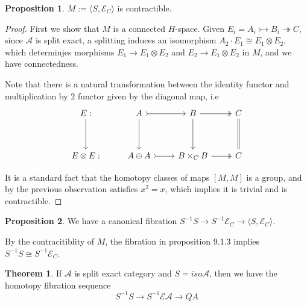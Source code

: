 \documentclass{article}
\theoremstyle{definition}
\newtheorem{theorem}{Theorem}[section]
\theoremstyle{definition}
\theoremstyle{definition}
\theoremstyle{definition}
\newtheorem{proposition}{Proposition}[theorem]
\theoremstyle{definition}
\theoremstyle{definition}
\theoremstyle{definition}
\begin{document}
\begin{tcolorbox}[colback=blue!5!white,colframe=blue!30!white]
\begin{proposition}
$M:=\langle S, \mathcal{E}_C \rangle$ is contractible.
\end{proposition}
\end{tcolorbox}
\begin{proof}
    First we show that $M$ is a connected $H$-space. Given $E_i=A_i\rightarrowtail B_i\twoheadrightarrow C$, since $\mathcal{A}$ is split exact, a splitting induces an isomorphism $A_2\cdot E_1\cong E_1\otimes E_2$, which determinjes morphisms $E_1\to E_1\otimes E_2$ and $E_2\to E_1\otimes E_2$ in $M$, and we have connectedness. 

    Note that there is a natural transformation between the identity functor and multiplication by $2$ functor given by the diagonal map, i.e 
    \[\begin{tikzcd}
        {E:} & A & B & C \\
        \\
        {E\otimes E:} & {A\oplus A} & {B\times_C B} & C
        \arrow[from=1-1, to=3-1]
        \arrow[tail, from=1-2, to=1-3]
        \arrow[from=1-2, to=3-2]
        \arrow[two heads, from=1-3, to=1-4]
        \arrow[from=1-3, to=3-3]
        \arrow[equal, from=1-4, to=3-4]
        \arrow[tail, from=3-2, to=3-3]
        \arrow[two heads, from=3-3, to=3-4]
    \end{tikzcd}\]

It is a standard fact that the homotopy classes of maps $[M,M]$ is a group, and by the previous observation satisfies $x^2=x$, which implies it is trivial and is contractible. 
\end{proof}


\begin{tcolorbox}[colback=blue!5!white,colframe=blue!30!white]
\begin{proposition}
We have a canonical fibration $S^{-1}S\to S^{-1}\mathcal{E}_C\to \langle S, \mathcal{E}_C\rangle$. 
\end{proposition}
\end{tcolorbox}
By the contracitiblity of $M$, the fibration in proposition $9.1.3$ implies $S^{-1}S\cong S^{-1}\mathcal{E}_C$. 


\begin{tcolorbox}[colback=red!5!white,colframe=red!30!white]
\begin{theorem}
If $\mathcal{A}$ is split exact category and $S= iso \mathcal{A}$, then we have the homotopy fibration sequence 
\[S^{-1}S\to S^{-1}\mathcal{E} \mathcal{A}\to QA\]
\end{theorem}
\end{tcolorbox}
\end{document}
